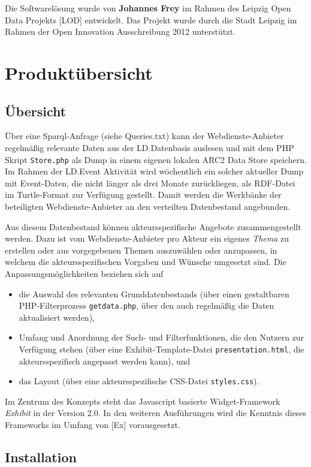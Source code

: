 \documentclass[11pt,a4paper]{article}
\begin{document}
Die Softwarelösung wurde von \textbf{Johannes Frey} im Rahmen des Leipzig Open
Data Projekts [LOD] entwickelt. Das Projekt wurde durch die Stadt Leipzig im
Rahmen der Open Innovation Ausschreibung 2012 unterstützt.

\section{Produktübersicht}

\subsection{Übersicht}

Über eine Sparql-Anfrage (siehe Queries.txt) kann der Webdienste-Anbieter
regelmäßig relevante Daten aus der LD.Datenbasis auslesen und mit dem PHP
Skript \texttt{Store.php} als Dump in einem eigenen lokalen ARC2 Data Store
speichern. Im Rahmen der LD.Event Aktivität wird wöchentlich ein solcher
aktueller Dump mit Event-Daten, die nicht länger als drei Monate zurückliegen,
als RDF-Datei im Turtle-Format zur Verfügung gestellt. Damit werden die
{\glqq}Werkbänke{\grqq} der beteiligten Webdienste-Anbieter an den verteilten
Datenbestand angebunden.

Aus diesem Datenbestand können akteursspezifische Angebote zusammengestellt
werden.  Dazu ist vom Webdienste-Anbieter pro Akteur ein eigenes \emph{Thema}
zu erstellen oder aus vorgegebenen Themen auszuwählen oder anzupassen, in
welchem die akteursspezifischen Vorgaben und Wünsche umgesetzt sind.  Die
Anpassungsmöglichkeiten beziehen sich auf
\begin{itemize}
\item die Auswahl des relevanten Grunddatenbestands (über einen gestaltbaren
  PHP-Filter\-prozess \texttt{getdata.php}, über den auch regelmäßig die Daten
  aktualisiert werden),
\item Umfang und Anordnung der Such- und Filterfunktionen, die den Nutzern zur
  Verfügung stehen (über eine Exhibit-Template-Datei
  \texttt{presentation.html}, die akteursspezifisch angepasst werden kann),
  und
\item das Layout (über eine akteursspezifische CSS-Datei \texttt{styles.css}). 
\end{itemize}
Im Zentrum des Konzepts steht das Javascript basierte Widget-Framework
\emph{Exhibit} in der Version 2.0. In den weiteren Ausführungen wird die
Kenntnis dieses Frameworks im Umfang von [Ex] vorausgesetzt.

\subsection{Installation}
\end{document}
